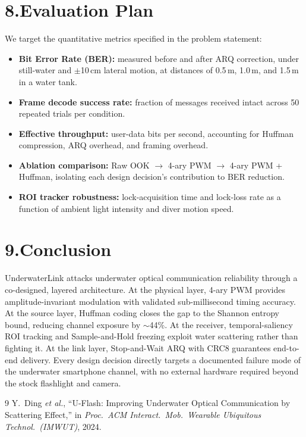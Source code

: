 \documentclass[10pt,a4paper]{article}
\begin{document}
\section{8.\enspace Evaluation Plan}

We target the quantitative metrics specified in the problem statement:

\begin{itemize}[leftmargin=*, topsep=5pt, itemsep=4pt]
  \item \textbf{Bit Error Rate (BER):} measured before and after ARQ correction,
        under still-water and $\pm$10\,cm lateral motion, at distances of
        0.5\,m, 1.0\,m, and 1.5\,m in a water tank.

  \item \textbf{Frame decode success rate:} fraction of messages received
        intact across 50 repeated trials per condition.

  \item \textbf{Effective throughput:} user-data bits per second, accounting
        for Huffman compression, ARQ overhead, and framing overhead.

  \item \textbf{Ablation comparison:}
        Raw OOK $\to$ 4-ary PWM $\to$ 4-ary PWM + Huffman, isolating each
        design decision's contribution to BER reduction.

  \item \textbf{ROI tracker robustness:} lock-acquisition time and lock-loss
        rate as a function of ambient light intensity and diver motion speed.
\end{itemize}

\section{9.\enspace Conclusion}

UnderwaterLink attacks underwater optical communication reliability through a
co-designed, layered architecture.
At the physical layer, 4-ary PWM provides amplitude-invariant modulation with
validated sub-millisecond timing accuracy.
At the source layer, Huffman coding closes the gap to the Shannon entropy bound,
reducing channel exposure by $\sim$44\%.
At the receiver, temporal-saliency ROI tracking and Sample-and-Hold freezing exploit
water scattering rather than fighting it.
At the link layer, Stop-and-Wait ARQ with CRC8 guarantees end-to-end delivery.
Every design decision directly targets a documented failure mode of the underwater
smartphone channel, with no external hardware required beyond the stock flashlight and camera.

\begin{thebibliography}{9}
  Y.\ Ding \emph{et al.},
  ``U-Flash: Improving Underwater Optical Communication by Scattering Effect,''
  in \emph{Proc.\ ACM Interact.\ Mob.\ Wearable Ubiquitous Technol.\ (IMWUT)}, 2024.
\end{thebibliography}
\end{document}
